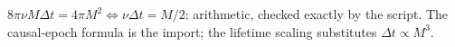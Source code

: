 $8\pi\nu M\Delta t = 4\pi M^2 \iff \nu\Delta t = M/2$: arithmetic, checked exactly by the script. The causal-epoch formula is the import; the lifetime scaling substitutes $\Delta t \propto M^3$.

